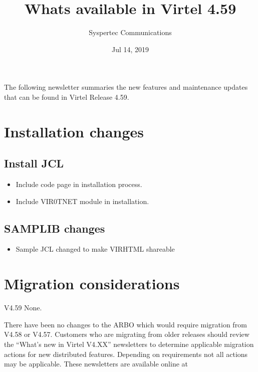 \documentclass[letterpaper,10pt,english]{sphinxmanual}
\title{Whats available in Virtel 4.59}
\date{Jul 14, 2019}
\author{Syspertec Communications}
\begin{document}
\pagestyle{empty}
\sphinxmaketitle
\pagestyle{plain}
\sphinxtableofcontents
\pagestyle{normal}
\label{\detokenize{TN201902::doc}}


The following newsletter summaries the new features and maintenance updates that can be found in Virtel Release 4.59.


\chapter{Installation changes}
\label{\detokenize{TN201902:installation-changes}}

\section{Install JCL}
\label{\detokenize{TN201902:install-jcl}}
\begin{itemize}
\item {} 
Include code page in installation process.

\end{itemize}

\begin{itemize}
\item {} 
Include VIR0TNET module in installation.

\end{itemize}


\section{SAMPLIB changes}
\label{\detokenize{TN201902:samplib-changes}}
\begin{itemize}
\item {} 
Sample JCL changed to make VIRHTML shareable

\end{itemize}


\chapter{Migration considerations}
\label{\detokenize{TN201902:migration-considerations}}
V4.59 None.

There have been no changes to the ARBO which would require migration from V4.58 or V4.57. Customers who are migrating from older releases should review the
“What’s new in Virtel V4.XX” newsletters to determine applicable migration actions for new distributed features.
Depending on requirements not all actions may be applicable. These newsletters are available online at 
\end{document}
